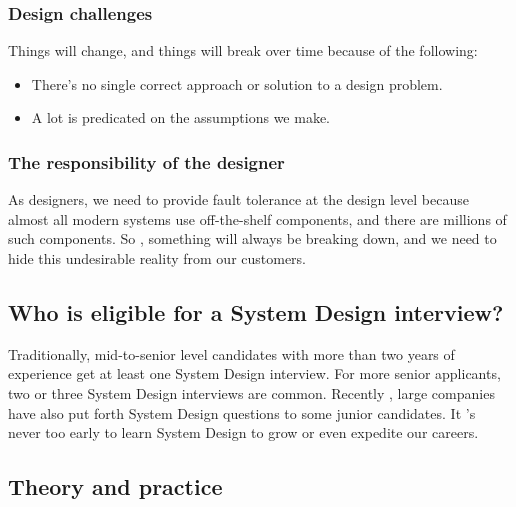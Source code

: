 \subsubsection{Design challenges}\label{nZJnKsWiZ6bj_cIjKDdFU}

Things will change, and things will break over time because of the following:

\begin{itemize}
\item
{}\label{fiLYEOCeBPR1YLaGeiO7S}
There's no single correct approach or solution to a design problem.
\item
{}\label{IXq9Ed_IvPwtFnOuQuv7H}
A lot is predicated on the assumptions we make.
\end{itemize}

\subsubsection{The responsibility of the designer}\label{MTHYQVvlf7r6TLxOJsFHt}

As designers, we need to provide fault tolerance at the design level because almost all modern systems use off-the-shelf components, and there are millions of such components. So , something will always be breaking down, and we need to hide this undesirable reality from our customers.

\subsection{Who is eligible for a System Design interview?}\label{x5Sz5Sjx3GbmLnHTHXnIZ}

Traditionally, mid-to-senior level candidates with more than two years of experience get at least one System Design interview. For more senior applicants, two or three System Design interviews are common. Recently , large companies have also put forth System Design questions to some junior candidates. It
's never too early to learn System Design to grow or even expedite our careers.

\subsection{Theory and practice}\label{Theory-and-practice}


